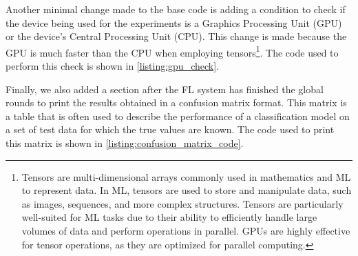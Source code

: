 Another minimal change made to the base code is adding a condition to check if the device being used for the experiments is a Graphics Processing Unit (GPU) or the device's Central Processing Unit (CPU). This change is made because the GPU is much faster than the CPU when employing tensors\footnote{Tensors are multi-dimensional arrays commonly used in mathematics and ML to represent data. In ML, tensors are used to store and manipulate data, such as images, sequences, and more complex structures. Tensors are particularly well-suited for ML tasks due to their ability to efficiently handle large volumes of data and perform operations in parallel. GPUs are highly effective for tensor operations, as they are optimized for parallel computing.}. The code used to perform this check is shown in \autoref{listing:gpu_check}.


Finally, we also added a section after the FL system has finished the global rounds to print the results obtained in a confusion matrix format. This matrix is a table that is often used to describe the performance of a classification model on a set of test data for which the true values are known. The code used to print this matrix is shown in \autoref{listing:confusion_matrix_code}.


